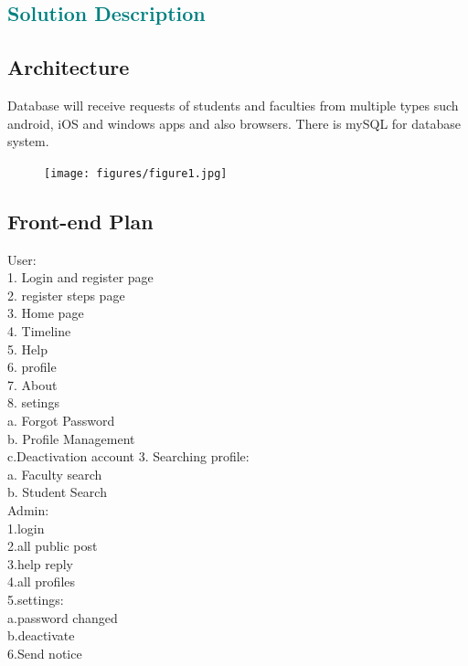 {\newpage
{\textcolor{teal}{\section{Solution Description}}}

\lipsum  %
\subsection{Architecture }
Database will receive requests of students and faculties from multiple types such android,
iOS and windows apps and also browsers. There is mySQL for database system.
\begin{figure}[ht]
\texttt{[image: figures/figure1.jpg]}
 
\label{fig:graph}
\end{figure}
\subsection{Front-end Plan }
User:\\
1. Login and register page\\
2. register steps page\\
3. Home page\\
4. Timeline\\
5. Help\\
6. profile\\
7. About\\
8. setings\\
a. Forgot Password\\
b. Profile Management\\
c.Deactivation account 
3. Searching profile:\\
a. Faculty search\\
b. Student Search\\

Admin:\\
1.login\\
2.all public post\\
3.help reply\\
4.all profiles\\
5.settings:\\
a.password changed\\
b.deactivate\\
6.Send notice\\
\lipsum %
}
